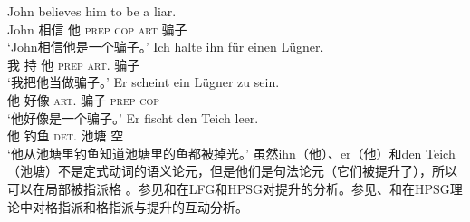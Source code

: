 \eal
\ex 
\gll John believes him to be a liar.\\
	 John 相信 他 \textsc{prep} \textsc{cop} \textsc{art} 骗子\\
\glt `John相信他是一个骗子。'
\ex 
\gll Ich halte ihn für einen Lügner.\\
	我 持 他 \textsc{prep} \textsc{art}.\acc{} 骗子\\
\glt `我把他当做骗子。'
\ex 
\gll Er scheint ein Lügner zu sein.\\
	 他 好像 \textsc{art}.\nom{} 骗子 \textsc{prep} \textsc{cop}\\
\glt `他好像是一个骗子。'	 
\ex 
\gll Er fischt den Teich leer.\\
	 他 钓鱼 \textsc{det}.\acc{} 池塘 空\\
\glt `他从池塘里钓鱼知道池塘里的鱼都被掉光。'
\zl
虽然ihn（他）、er（他）和den Teich（池塘）不是定式动词的语义论元，但是他们是句法论元（它们被提升了），所以可以在局部被指派格 。参见和在LFG\indexlfgc 和HPSG\indexhpsgc 对提升的分析。参见、和在HPSG理论中对格指派和格指派与提升的互动分析。

